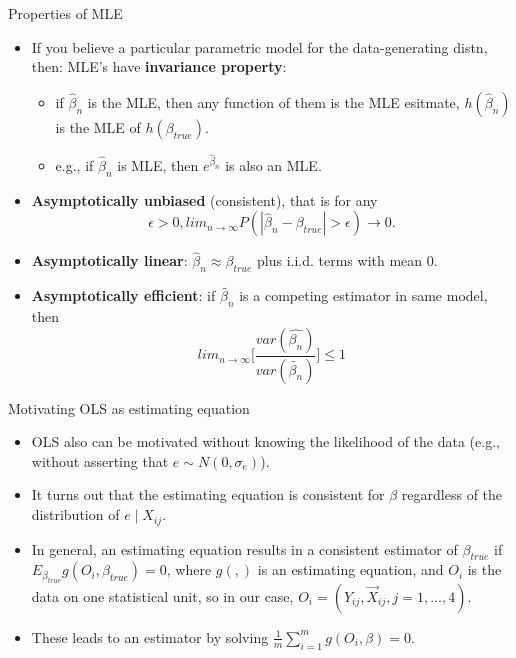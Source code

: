 \documentclass[ignorenonframetext,]{beamer}
\providecommand{\tightlist}{%
  \setlength{\itemsep}{0pt}\setlength{\parskip}{0pt}}
\begin{document}
\begin{frame}{Properties of MLE}

\begin{itemize}
\tightlist
\item
  If you believe a particular parametric model for the data-generating
  distn, then: MLE's have \textbf{invariance property}:

  \begin{itemize}
  \tightlist
  \item
    if \(\hat{\beta}_n\) is the MLE, then any function of them is the
    MLE esitmate, \(h(\hat{\beta}_n)\) is the MLE of
    \(h(\beta_{true})\).
  \item
    e.g., if \(\hat{\beta}_n\) is MLE, then \(e^{\hat{\beta}_n}\) is
    also an MLE.
  \end{itemize}
\item
  \textbf{Asymptotically unbiased} (consistent), that is for any
  \[\epsilon > 0, lim_{n \rightarrow \infty} P(|\hat{\beta}_n-\beta_{true}|>\epsilon) \rightarrow 0. \]
\item
  \textbf{Asymptotically linear}: \(\hat{\beta}_n \approx \beta_{true}\)
  plus i.i.d. terms with mean 0.
\item
  \textbf{Asymptotically efficient}: if \(\tilde{\beta_n}\) is a
  competing estimator in same model, then
  \[lim_{n \rightarrow \infty} \Big[ \frac{var(\hat{\beta_n})}{var(\tilde{\beta_n})} \Big] \le 1 \]
\end{itemize}

\end{frame}

\begin{frame}{Motivating OLS as estimating equation}

\begin{itemize}
\tightlist
\item
  OLS also can be motivated without knowing the likelihood of the data
  (e.g., without asserting that \(e \sim N(0,\sigma_e)\)).
\item
  It turns out that the estimating equation is consistent for \(\beta\)
  regardless of the distribution of \(e \mid X_{ij}\).
\item
  In general, an estimating equation results in a consistent estimator
  of \(\beta_{true}\) if \(E_{\beta_{true}}g(O_i,\beta_{true})=0\),
  where \(g(,)\) is an estimating equation, and \(O_i\) is the data on
  one statistical unit, so in our case,
  \(O_i=(Y_{ij},\vec{X}_{ij},j=1,...,4)\).\\
\item
  These leads to an estimator by solving
  \(\frac{1}{m} \sum_{i = 1}^m g(O_i,\beta) = 0\).
\end{itemize}

\end{frame}
\end{document}
